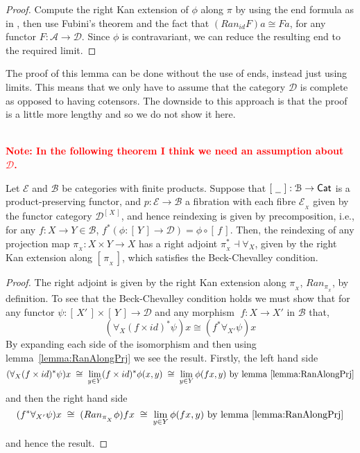 \documentclass[a4paper,UKenglish]{lipics}
\newcommand\note[1]{{ \bf \textcolor{red} {\vspace{2mm}\; \\ Note: #1\\}}}
\newcommand{\msf}[1]{\mathsf{#1}} %
\newcommand{\Cat}{\msf{Cat}}
\newcommand{\A}{\mathcal{A}}
\newcommand{\B}{\mathcal{B}}
\newcommand{\D}{\mathcal{D}}
\newcommand{\E}{\mathcal{E}}
\newcommand{\fibreE}[1]{\E_{_{#1}}}
\newcommand{\blank}{\, \underline{\hspace{2mm}} \,}
\newcommand{\SqFun}[1][\blank]{[\, #1 \, ]} %
\begin{document}
\begin{proof}
Compute the right Kan extension of $\phi$ along $\pi$ by using the end formula as in \cite{mac1998categories}, then use Fubini's theorem and the fact that $(Ran_{id} F)a \cong Fa$, for any functor $F: \A\rightarrow \mathcal{D}$. Since $\phi$ is contravariant, we can reduce the resulting end to the required limit.
\end{proof}
The proof of this lemma can be done without the use of ends, instead just using limits. This means that we only have to assume that the category $\mathcal{D}$ is complete as opposed to having cotensors. The downside to this approach is that the proof is a little more lengthy and so we do not show it here.


\note{In the following theorem I think we need an assumption about $\D$.}

\begin{theorem}
\label{thm:BC}
Let $\E$ and $\B$ be categories with finite products. Suppose that $\SqFun : \B \rightarrow \Cat$ is a product-preserving functor, and $p:\E\rightarrow \B$ a fibration with each fibre $\fibreE{X}$ given by the functor category $\mathcal{D}^{\SqFun[X]}$, and hence reindexing is given by precomposition, i.e., for any $f:X\rightarrow Y \in \B$, $f^\ast (\phi : \SqFun[Y] \rightarrow \D) = \phi \circ \SqFun[f]$.
Then, the reindexing of any projection map $\pi_{_{X}} :X\times Y \rightarrow X $ has a right adjoint $\pi_{_{X}}^\ast \dashv \forall_X$, given by the right Kan extension along $\SqFun[\pi_{_{X}}]$, which satisfies the Beck-Chevalley condition.
\end{theorem}


\begin{proof}
The right adjoint is given by the right Kan extension along $\pi_{_{X}}$, $Ran_{\pi_{_{X}}} $, by definition. To see that the Beck-Chevalley condition holds we must show that for any functor $\psi: \SqFun[X'] \times \SqFun[Y] \rightarrow \D$ and any morphism $\; f:X\rightarrow X'$ in $\B$ that,
\[
(\forall_X(f\times id)^\ast \psi)x \cong (f^\ast \forall_{X'} \psi) x
\]
By expanding each side of the isomorphism and then using lemma~\ref{lemma:RanAlongPrj} we see the result. Firstly, the left hand side
\[
(\forall_X (f \times id)^\ast \psi)x  \; \cong \; \lim_{y \in Y} (f \times id)^{\ast} \phi (x,y) \; \cong \; \lim_{y\in Y} \phi(fx,y) \text{ by lemma~\ref{lemma:RanAlongPrj}}
\]
and then the right hand side
\[
(f^\ast \forall_{X'} \psi) x  \; \cong \;  (Ran_{\pi_{_{X}}} \phi ) fx \; \cong \;       \lim_{y\in Y} \phi (fx,y) \text{ by lemma~\ref{lemma:RanAlongPrj}}
\]

and hence the result.
\end{proof}
\end{document}

